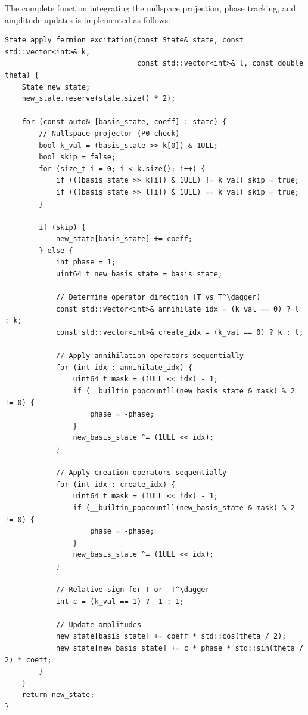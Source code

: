 The complete function integrating the nullspace projection, phase tracking, and amplitude updates is implemented as follows:
\begin{verbatim}
State apply_fermion_excitation(const State& state, const std::vector<int>& k,
                               const std::vector<int>& l, const double theta) {
    State new_state;
    new_state.reserve(state.size() * 2);

    for (const auto& [basis_state, coeff] : state) {
        // Nullspace projector (P0 check)
        bool k_val = (basis_state >> k[0]) & 1ULL;
        bool skip = false;
        for (size_t i = 0; i < k.size(); i++) {
            if (((basis_state >> k[i]) & 1ULL) != k_val) skip = true;
            if (((basis_state >> l[i]) & 1ULL) == k_val) skip = true;
        }

        if (skip) {
            new_state[basis_state] += coeff;
        } else {
            int phase = 1;
            uint64_t new_basis_state = basis_state;

            // Determine operator direction (T vs T^\dagger)
            const std::vector<int>& annihilate_idx = (k_val == 0) ? l : k;
            const std::vector<int>& create_idx = (k_val == 0) ? k : l;

            // Apply annihilation operators sequentially
            for (int idx : annihilate_idx) {
                uint64_t mask = (1ULL << idx) - 1;
                if (__builtin_popcountll(new_basis_state & mask) % 2 != 0) {
                    phase = -phase;
                }
                new_basis_state ^= (1ULL << idx);
            }

            // Apply creation operators sequentially
            for (int idx : create_idx) {
                uint64_t mask = (1ULL << idx) - 1;
                if (__builtin_popcountll(new_basis_state & mask) % 2 != 0) {
                    phase = -phase;
                }
                new_basis_state ^= (1ULL << idx);
            }

            // Relative sign for T or -T^\dagger
            int c = (k_val == 1) ? -1 : 1;

            // Update amplitudes
            new_state[basis_state] += coeff * std::cos(theta / 2);
            new_state[new_basis_state] += c * phase * std::sin(theta / 2) * coeff;
        }
    }
    return new_state;
}
\end{verbatim}

